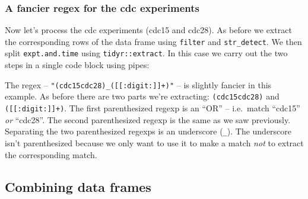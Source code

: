 \documentclass[]{book}
\newenvironment{Shaded}{\begin{snugshade}}{\end{snugshade}}
\newcommand{\CommentTok}[1]{\textcolor[rgb]{0.56,0.35,0.01}{\textit{#1}}}
\newcommand{\DataTypeTok}[1]{\textcolor[rgb]{0.13,0.29,0.53}{#1}}
\newcommand{\KeywordTok}[1]{\textcolor[rgb]{0.13,0.29,0.53}{\textbf{#1}}}
\newcommand{\NormalTok}[1]{#1}
\newcommand{\OperatorTok}[1]{\textcolor[rgb]{0.81,0.36,0.00}{\textbf{#1}}}
\newcommand{\OtherTok}[1]{\textcolor[rgb]{0.56,0.35,0.01}{#1}}
\newcommand{\StringTok}[1]{\textcolor[rgb]{0.31,0.60,0.02}{#1}}
\theoremstyle{definition}
\theoremstyle{definition}
\theoremstyle{definition}
\theoremstyle{remark}
\begin{document}
\hypertarget{a-fancier-regex-for-the-cdc-experiments}{%
\subsubsection{A fancier regex for the cdc
experiments}\label{a-fancier-regex-for-the-cdc-experiments}}

Now let's process the cdc experiments (cdc15 and cdc28). As before we
extract the corresponding rows of the data frame using \texttt{filter}
and \texttt{str\_detect}. We then split \texttt{expt.and.time} using
\texttt{tidyr::extract}. In this case we carry out the two steps in a
single code block using pipes:

\begin{Shaded}
\end{Shaded}

The regex -- \texttt{"(cdc15\textbar{}cdc28)\_({[}{[}:digit:{]}{]}+)"}
-- is slightly fancier in this example. As before there are two parts
we're extracting: \texttt{(cdc15\textbar{}cdc28)} and
\texttt{({[}{[}:digit:{]}{]}+)}. The first parenthesized regexp is an
``OR'' -- i.e.~match ``cdc15'' \emph{or} ``cdc28''. The second
parenthesized regexp is the same as we saw previously. Separating the
two parenthesized regexps is an underscore (\texttt{\_}). The underscore
isn't parenthesized because we only want to use it to make a match
\emph{not} to extract the corresponding match.

\hypertarget{combining-data-frames}{%
\subsection{Combining data frames}\label{combining-data-frames}}
\end{document}
